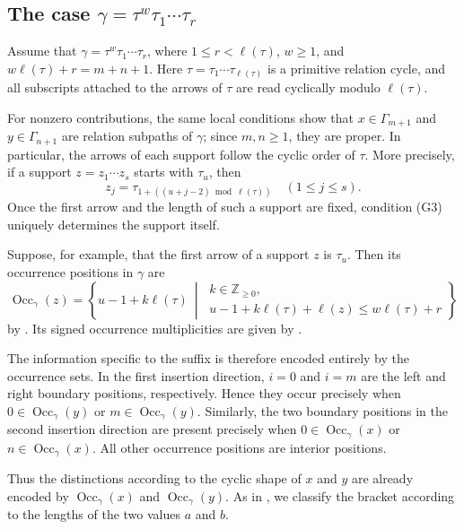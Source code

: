 \documentclass[11pt,a4paper,reqno]{amsart}
\newcommand{\Occ}{\operatorname{Occ}}
\newcommand{\taue}{\tau_{\ell(\tau)}}
\theoremstyle{plain}
\theoremstyle{definition}
\numberwithin{equation}{section}
\begin{document}
	\subsection{The case \texorpdfstring{$\gamma=\tau^w\tau_1\cdots\tau_r$}{gamma = tau power w with suffix}}
	\label{sec:higher-power-suffix}
	
	Assume that $\gamma=\tau^w\tau_1\cdots\tau_r$, where
	$1\leq r<\ell(\tau)$, $w\geq1$, and
	$w\ell(\tau)+r=m+n+1$.  Here $\tau=\tau_1\cdots\taue$ is a primitive
	relation cycle, and all subscripts attached to the arrows of $\tau$ are read
	cyclically modulo $\ell(\tau)$.
	
	For nonzero contributions, the same local conditions
	show that $x\in\Gamma_{m+1}$ and $y\in\Gamma_{n+1}$ are relation subpaths
	of $\gamma$; since $m,n\geq1$, they are proper. In particular, the arrows of
	each support follow the cyclic order of $\tau$. More precisely, if a support
	$z=z_1\cdots z_s$ starts with $\tau_u$, then
	\[
	z_j=\tau_{1+((u+j-2)\bmod \ell(\tau))}
	\quad(1\leq j\leq s).
	\]
	Once the first arrow and the length of such a support are fixed, condition
	\textup{(G3)} uniquely determines the support itself.
	
	Suppose, for example, that the first arrow of a support $z$ is $\tau_u$.
	Then its occurrence positions in $\gamma$ are
	\[
	\Occ_\gamma(z)
	=
	\left\{
	u-1+k\ell(\tau)
	\ \middle|\
	\begin{array}{l}
		k\in\mathbb Z_{\geq0},\\[1mm]
		u-1+k\ell(\tau)+\ell(z)
		\leq w\ell(\tau)+r
	\end{array}
	\right\}
	\]
	by .  Its signed occurrence multiplicities are
	given by \Cref{cor:signed-periodic-multiplicity}.
	
	The information specific to the suffix is therefore encoded entirely by the
	occurrence sets.  In the first insertion direction, $i=0$ and $i=m$ are the
	left and right boundary positions, respectively.  Hence they occur precisely
	when $0\in\Occ_\gamma(y)$ or $m\in\Occ_\gamma(y)$.  Similarly, the two
	boundary positions in the second insertion direction are present precisely
	when $0\in\Occ_\gamma(x)$ or $n\in\Occ_\gamma(x)$.  All other occurrence
	positions are interior positions.
	
	Thus the distinctions according to the cyclic shape of $x$ and $y$ are
	already encoded by $\Occ_\gamma(x)$ and $\Occ_\gamma(y)$.
	As in , we classify the bracket according to the
	lengths of the two values $a$ and $b$.
	
\end{document}
